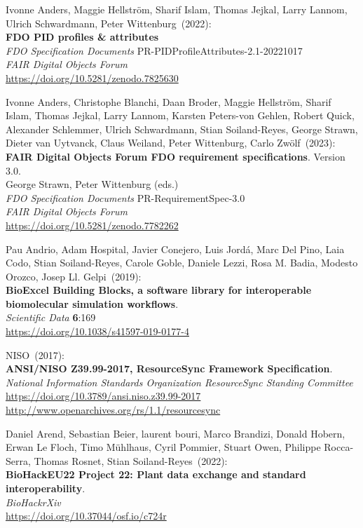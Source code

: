 \begin{thebibliography}{9}
Ivonne Anders, Maggie Hellström, Sharif Islam, Thomas Jejkal, Larry
Lannom, Ulrich Schwardmann, Peter Wittenburg~(2022): \\
\textbf{{FDO PID} profiles \& attributes} \\
\emph{FDO Specification Documents} PR-PIDProfileAttributes-2.1-20221017 \\
\emph{FAIR Digital Objects Forum}\\
\url{https://doi.org/10.5281/zenodo.7825630}

Ivonne Anders, Christophe Blanchi, Daan Broder, Maggie Hellström, Sharif Islam, Thomas Jejkal, Larry Lannom, Karsten Peters-von Gehlen, Robert Quick, Alexander Schlemmer, Ulrich Schwardmann, Stian Soiland-Reyes, George Strawn, Dieter van Uytvanck, Claus Weiland, Peter Wittenburg, Carlo Zwölf~(2023): \\
\textbf{{FAIR Digital Objects Forum FDO} requirement specifications}. Version 3.0.\\
George Strawn, Peter Wittenburg (eds.)\\
\emph{FDO Specification Documents} PR-RequirementSpec-3.0\\
\emph{FAIR Digital Objects Forum}\\
\url{https://doi.org/10.5281/zenodo.7782262}

Pau Andrio, Adam Hospital, Javier Conejero, Luis Jordá, Marc
Del Pino, Laia Codo, Stian Soiland-Reyes, Carole Goble, Daniele Lezzi,
Rosa M. Badia, Modesto Orozco, Josep Ll. Gelpi~(2019): \\
\textbf{BioExcel Building Blocks, a software library for interoperable
biomolecular simulation workflows}.\\
\emph{Scientific Data} \textbf{6}:169\\
\url{https://doi.org/10.1038/s41597-019-0177-4}

NISO~(2017): \\
\textbf{ANSI/NISO Z39.99-2017, ResourceSync Framework Specification}.\\
\emph{National Information Standards Organization ResourceSync Standing Committee}\\
\url{https://doi.org/10.3789/ansi.niso.z39.99-2017}\\
\url{http://www.openarchives.org/rs/1.1/resourcesync}

Daniel Arend, Sebastian Beier, laurent bouri, Marco Brandizi, Donald Hobern, Erwan Le Floch, Timo Mühlhaus, Cyril Pommier, Stuart Owen, Philippe Rocca-Serra, Thomas Rosnet, Stian Soiland-Reyes~(2022): \\
\textbf{BioHackEU22 Project 22: Plant data exchange and standard interoperability}.\\
\emph{BioHackrXiv}\\
\url{https://doi.org/10.37044/osf.io/c724r}


\end{thebibliography}
